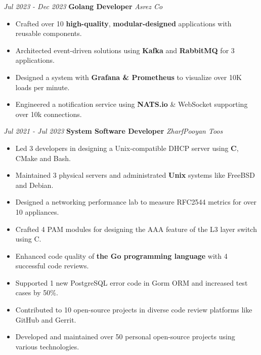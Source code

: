\documentclass{engineercv}
\begin{document}
\begin{twocolentry}{\textit{Jul 2023 - Dec 2023}}
  \textbf{Golang Developer}
  \textit{Asrez Co}
\end{twocolentry}

\begin{itemize}
  \item Crafted over 10 \textbf{high-quality}, \textbf{modular-designed} applications with reusable components.
  \item Architected event-driven solutions using \textbf{Kafka} and \textbf{RabbitMQ} for 3 applications.
  \item Designed a system with \textbf{Grafana \& Prometheus} to visualize over 10K loads per minute.
  \item Engineered a notification service using \textbf{NATS.io} \& WebSocket supporting over 10k connections.
\end{itemize}

\begin{twocolentry}{\textit{Jul 2021 - Jul 2023}}
  \textbf{System Software Developer}
  \textit{ZharfPooyan Toos}
\end{twocolentry}

\begin{itemize}
  \item Led 3 developers in designing a Unix-compatible DHCP server using \textbf{C}, CMake and Bash.
  \item Maintained 3 physical servers and administrated \textbf{Unix} systems like FreeBSD and Debian.
  \item Designed a networking performance lab to measure RFC2544 metrics for over 10 appliances.
  \item Crafted 4 PAM modules for designing the AAA feature of the L3 layer switch using C.
\end{itemize}

\begin{itemize}
  \item Enhanced code quality of \textbf{the Go programming language} with 4 successful code reviews.
  \item Supported 1 new PostgreSQL error code in Gorm ORM and increased test cases by 50\%.
  \item Contributed to 10 open-source projects in diverse code review platforms like GitHub and Gerrit.
  \item Developed and maintained over 50 personal open-source projects using various technologies.
\end{itemize}
\end{document}
